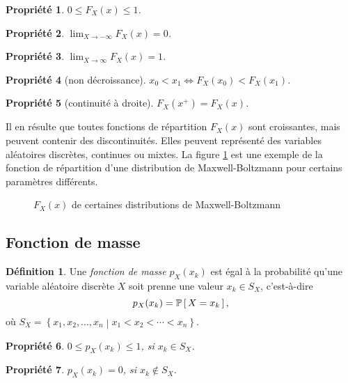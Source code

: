 \documentclass[11pt]{article}
\makeatletter
\renewcommand\P[1]{%
	\ensuremath{%
		\mathbb{P}\left[\,#1\,\right]%
	}%
}%
\newtheorem{property}{Propriété}
\theoremstyle{remark}
\theoremstyle{definition}
\newtheorem*{@definition}{Définition}
\newenvironment{definition}{%
	\begin{@definition}%
}{%
	\end{@definition}%
	\setcounter{property}{0}%
}
\makeatother
\begin{document}
\begin{property}
	$0\leq F_X(x)\leq 1$.
\end{property}

\begin{property}
	$\displaystyle\lim_{X\rightarrow-\infty}F_X(x)=0$.
\end{property}

\begin{property}
	$\displaystyle\lim_{X\rightarrow \infty}F_X(x)=1$.
\end{property}

\begin{property}[non décroissance]
	$x_0<x_1\Leftrightarrow F_X(x_0)<F_X(x_1)$.
\end{property}

\begin{property}[continuité à droite]
	$F_X(x^+)=F_X(x)$.
\end{property}

Il en résulte que toutes fonctions de répartition $F_X(x)$ sont croissantes,
mais peuvent contenir des discontinuités. Elles peuvent représenté des
variables aléatoires discrètes, continues ou mixtes. La figure
\ref{fig:maxwell} est une exemple de la fonction de répartition d'une
distribution de Maxwell-Boltzmann pour certains paramètres différents.

\begin{figure}[H]
	\centering
	\caption{$F_X(x)$ de certaines distributions de Maxwell-Boltzmann}
	
	\label{fig:maxwell}
\end{figure}

\subsection{Fonction de masse}
\begin{definition}
	Une \textit{fonction de masse} $p_X(x_k)$ est égal à la probabilité qu'une
	variable aléatoire discrète $X$ soit prenne une valeur $x_k\in S_X$,
	c'est-à-dire 
	\begin{equation*}
		p_X(x_k)=\P{X=x_k},
	\end{equation*}
	où $S_X=\left\{x_1,x_2,\dots,x_n\middle\rvert x_1<x_2<\cdots<x_n\right\}$.
\end{definition}

\begin{property}
	$0\leq p_X(x_k)\leq 1$, si $x_k\in S_X$.
\end{property}

\begin{property}
	$p_X(x_k)=0$, si $x_k\notin S_X$.
\end{property}
\end{document}

